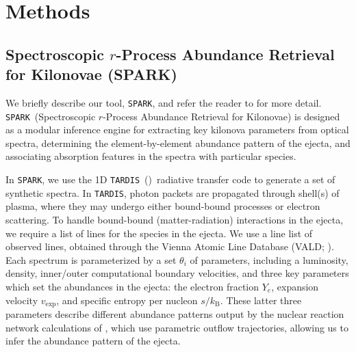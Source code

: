 \documentclass[twocolumn,twocolappendix]{aastex63}
\def\SPARK{\texttt{SPARK}}
\def\TARDIS{\texttt{TARDIS}}
\def\V23{\citetalias{vieira23}}
\begin{document}





\section{Methods}\label{sec:methods}

\subsection{Spectroscopic $r$-Process Abundance Retrieval for Kilonovae (\textsc{SPARK})}\label{ssc:spark-summary}

We briefly describe our tool, \SPARK, and refer the reader to \V23 for more detail. \SPARK~(Spectroscopic $r$-Process Abundance Retrieval for Kilonovae) is designed as a modular inference engine for extracting key kilonova parameters from optical spectra, determining the element-by-element abundance pattern of the ejecta, and associating absorption features in the spectra with particular species. 

In \SPARK, we use the 1D \TARDIS~(\citealt{kerzendorf14, kerzendorf23})~radiative transfer code to generate a set of synthetic spectra. In \TARDIS, photon packets are propagated through shell(s) of plasma, where they may undergo either bound-bound processes or electron scattering. To handle bound-bound (matter-radiation) interactions in the ejecta, we require a list of lines for the species in the ejecta. We use a line list of observed lines, obtained through the Vienna Atomic Line Database (VALD; \citealt{ryabchikova15, pakhomov19}). Each spectrum is parameterized by a set $\theta_i$ of parameters, including a luminosity, density, inner/outer computational boundary velocities, and three key parameters which set the abundances in the ejecta: the electron fraction $Y_e$, expansion velocity $v_{\mathrm{exp}}$, and specific entropy per nucleon $s / k_{\mathrm{B}}$. These latter three parameters describe different abundance patterns output by the nuclear reaction network calculations of \cite{wanajo18}, which use parametric outflow trajectories, allowing us to infer the abundance pattern of the ejecta.  
\end{document}
